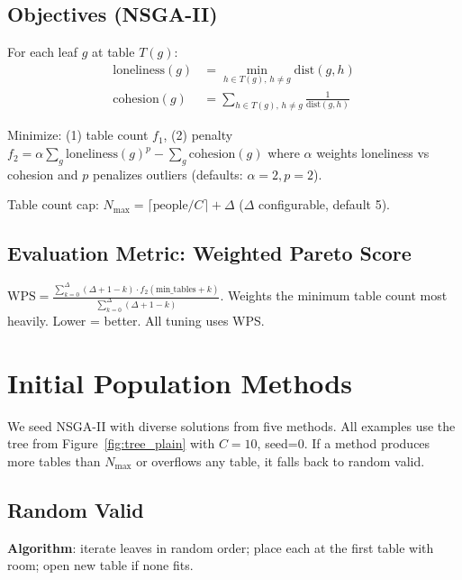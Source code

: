 \documentclass[11pt,a4paper]{article}
\begin{document}
\subsection{Objectives (NSGA-II)}

For each leaf $g$ at table $T(g)$:
\begin{align}
    \mathrm{loneliness}(g) &= \min_{h \in T(g),\, h \neq g} \mathrm{dist}(g, h) \\
    \mathrm{cohesion}(g) &= \sum_{h \in T(g),\, h \neq g} \frac{1}{\mathrm{dist}(g, h)}
\end{align}

Minimize: (1) table count $f_1$, (2) penalty $f_2 = \alpha\sum_g \mathrm{loneliness}(g)^p - \sum_g \mathrm{cohesion}(g)$ where $\alpha$ weights loneliness vs cohesion and $p$ penalizes outliers (defaults: $\alpha=2, p=2$).

Table count cap: $N_{\max} = \lceil\text{people}/C\rceil + \Delta$ ($\Delta$ configurable, default 5).

\subsection{Evaluation Metric: Weighted Pareto Score}

$\text{WPS} = \frac{\sum_{k=0}^{\Delta} (\Delta+1-k) \cdot f_2(\text{min\_tables}+k)}{\sum_{k=0}^{\Delta} (\Delta+1-k)}$.
Weights the minimum table count most heavily.  Lower = better.  All tuning uses WPS.

\section{Initial Population Methods}
\label{sec:init}

We seed NSGA-II with diverse solutions from five methods.  All examples use the tree from Figure~\ref{fig:tree_plain} with $C=10$, seed=0.  If a method produces more tables than $N_{\max}$ or overflows any table, it falls back to random valid.

\subsection{Random Valid}

\textbf{Algorithm}: iterate leaves in random order; place each at the first table with room; open new table if none fits.
\end{document}
